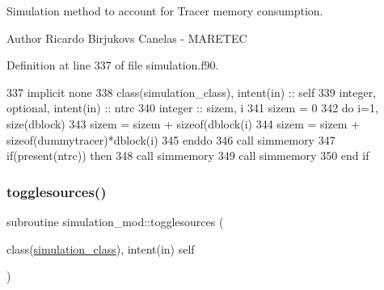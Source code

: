 Simulation method to account for Tracer memory consumption. 

\begin{DoxyAuthor}{Author}
Ricardo Birjukovs Canelas -\/ M\+A\+R\+E\+T\+EC 
\end{DoxyAuthor}


Definition at line 337 of file simulation.\+f90.


\begin{DoxyCode}
337     \textcolor{keywordtype}{implicit none}
338     \textcolor{keywordtype}{class}(simulation\_class), \textcolor{keywordtype}{intent(in)} :: self
339     \textcolor{keywordtype}{integer}, \textcolor{keywordtype}{optional}, \textcolor{keywordtype}{intent(in)} :: ntrc
340     \textcolor{keywordtype}{integer} :: sizem, i
341     sizem = 0
342     \textcolor{keywordflow}{do} i=1, \textcolor{keyword}{size}(dblock)
343         sizem = sizem + sizeof(dblock(i)%
344         sizem = sizem + sizeof(dummytracer)*dblock(i)%
345 \textcolor{keywordflow}{    enddo}  
346     \textcolor{keyword}{call }simmemory%
347     \textcolor{keywordflow}{if}(\textcolor{keyword}{present}(ntrc)) \textcolor{keywordflow}{then}
348         \textcolor{keyword}{call }simmemory%
349         \textcolor{keyword}{call }simmemory%
350 \textcolor{keywordflow}{    end if}
\end{DoxyCode}
\mbox{\label{namespacesimulation__mod_a87a5141e4516b9610a6e4f0d2ff2d719}} 
\subsubsection{\texorpdfstring{togglesources()}{togglesources()}}
{\footnotesize\ttfamily subroutine simulation\+\_\+mod\+::togglesources (\begin{DoxyParamCaption}\item[{class(\mbox{\hyperlink{structsimulation__mod_1_1simulation__class}{simulation\+\_\+class}}), intent(in)}]{self }\end{DoxyParamCaption})\hspace{0.3cm}{\ttfamily [private]}}



